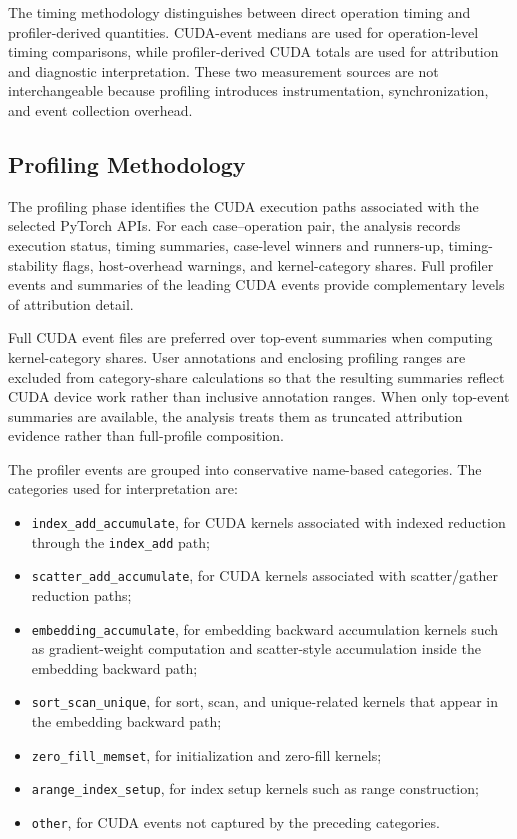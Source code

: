 The timing methodology distinguishes between direct operation timing and profiler-derived quantities. CUDA-event medians are used for operation-level timing comparisons, while profiler-derived CUDA totals are used for attribution and diagnostic interpretation. These two measurement sources are not interchangeable because profiling introduces instrumentation, synchronization, and event collection overhead.

\subsection{Profiling Methodology}

The profiling phase identifies the CUDA execution paths associated with the selected PyTorch APIs. For each case--operation pair, the analysis records execution status, timing summaries, case-level winners and runners-up, timing-stability flags, host-overhead warnings, and kernel-category shares. Full profiler events and summaries of the leading CUDA events provide complementary levels of attribution detail.

Full CUDA event files are preferred over top-event summaries when computing kernel-category shares. User annotations and enclosing profiling ranges are excluded from category-share calculations so that the resulting summaries reflect CUDA device work rather than inclusive annotation ranges. When only top-event summaries are available, the analysis treats them as truncated attribution evidence rather than full-profile composition.

The profiler events are grouped into conservative name-based categories. The categories used for interpretation are:

\begin{itemize}[leftmargin=*]
    \item \texttt{index\_add\_accumulate}, for CUDA kernels associated with indexed reduction through the \texttt{index\_add} path;
    \item \texttt{scatter\_add\_accumulate}, for CUDA kernels associated with scatter/gather reduction paths;
    \item \texttt{embedding\_accumulate}, for embedding backward accumulation kernels such as gradient-weight computation and scatter-style accumulation inside the embedding backward path;
    \item \texttt{sort\_scan\_unique}, for sort, scan, and unique-related kernels that appear in the embedding backward path;
    \item \texttt{zero\_fill\_memset}, for initialization and zero-fill kernels;
    \item \texttt{arange\_index\_setup}, for index setup kernels such as range construction;
    \item \texttt{other}, for CUDA events not captured by the preceding categories.
\end{itemize}

